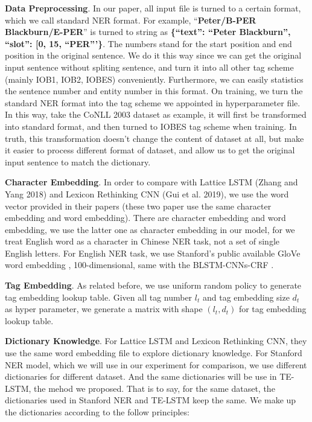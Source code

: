 \documentclass[letterpaper]{article} %
\begin{document}
\textbf{Data Preprocessing}. In our paper, all input file is turned to a certain format, which we call standard NER format. For example, ``\textbf{Peter/B-PER Blackburn/E-PER}'' is turned to string as \textbf{\{``text'': ``Peter Blackburn'', ``slot'': [0, 15, ``PER'''\}}. The numbers stand for the start position and end position in the original sentence. We do it this way since we can get the original input sentence without spliting sentence, and turn it into all other tag scheme (mainly IOB1, IOB2, IOBES) conveniently. Furthermore, we can easily statistics the sentence number and entity number in this format. On training, we turn the standard NER format into the tag scheme we appointed in hyperparameter file. In this way, take the CoNLL 2003 dataset as example, it will first be transformed into standard format, and then turned to IOBES tag scheme when training. In truth, this transformation doesn't change the content of dataset at all, but make it easier to process different format of dataset, and allow us to get the original input sentence to match the dictionary.

\textbf{Character Embedding}. In order to compare with Lattice LSTM (Zhang and Yang 2018) and Lexicon Rethinking CNN (Gui et al. 2019), we use the word vector provided in their papers (these two paper use the same character embedding and word embedding). There are character embedding and word embedding, we use the latter one as character embedding in our model, for we treat English word as a character in Chinese NER task, not a set of single English letters. For English NER task, we use Stanford's public available GloVe word embedding \cite{glove}, 100-dimensional, same with the BLSTM-CNNs-CRF \cite{mahovy}.

\textbf{Tag Embedding}. As related before, we use uniform random policy to generate tag embedding lookup table. Given all tag number $l_t$ and tag embedding size $d_t$ as hyper parameter, we generate a matrix with shape $(l_t, d_t)$ for tag embedding lookup table.

\textbf{Dictionary Knowledge}. For Lattice LSTM and Lexicon Rethinking CNN, they use the same word embedding file to explore dictionary knowledge. For Stanford NER \cite{stner} model, which we will use in our experiment for comparison, we use different dictionaries for different dataset. And the same dictionaries will be use in TE-LSTM, the mehod we proposed. That is to say, for the same dataset, the dictionaries used in Stanford NER and TE-LSTM keep the same. We make up the dictionaries according to the follow principles:
\end{document}
